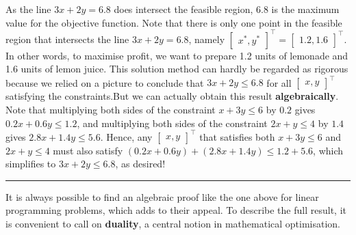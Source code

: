 As the line \(3x+2y = 6.8\) does intersect the feasible region, \(6.8\)
is the maximum value for the objective function. Note that there is only
one point in the feasible region that intersects the line \(3x+2y=6.8\),
namely
\(\begin{bmatrix} x^*, y^*\end{bmatrix}^{\!\top} = \begin{bmatrix} 1.2, 1.6\end{bmatrix}^{\!\top}.\)
In other words, to maximise profit, we want to prepare 1.2 units of
lemonade and 1.6 units of lemon juice.
\newpage\noindent This solution method can hardly be regarded as rigorous because we
relied on a picture to conclude that \(3x + 2y \leq 6.8\) for all
\(\begin{bmatrix} x,y\end{bmatrix}^{\!\top}\) satisfying the constraints.\newl But we
can actually obtain  this result \textbf{algebraically}. Note that multiplying both
sides of the constraint \(x + 3y \leq 6\) by \(0.2\) gives
\(0.2x + 0.6 y \leq 1.2\), and multiplying both sides of the constraint
\(2x + y \leq 4\) by \(1.4\) gives \(2.8x + 1.4 y \leq 5.6\). Hence, any
\(\begin{bmatrix} x,y\end{bmatrix}^{\!\top}\) that satisfies both \(x+3y\leq 6\)
and \(2x+y \leq 4\) must also satisfy
\((0.2x+0.6y) + (2.8x+1.4y) \leq 1.2 + 5.6\), which simplifies to
\(3x + 2y \leq 6.8\), as desired! 
\begin{center}\rule{0.5\linewidth}{.4pt}\end{center}
It is always possible to find an algebraic proof like the one above for
linear programming problems, which adds to their appeal. To describe the full result, it is
convenient to call on \textbf{duality}, a central notion in mathematical
optimisation.
